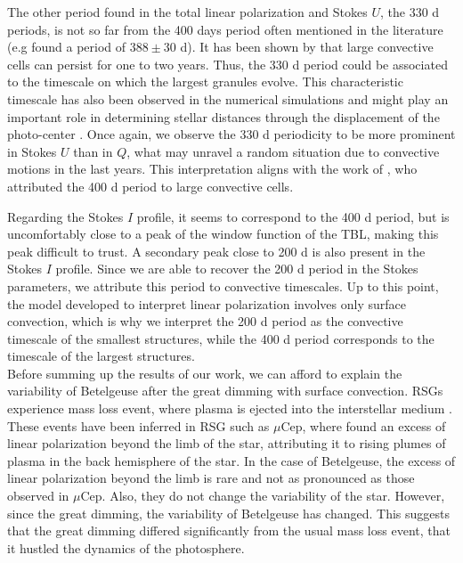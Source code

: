 \documentclass{aa}
\begin{document}
The other period found in the total linear polarization and Stokes $U$, the 330 d periods, is not so far from the 400 days period often mentioned in the literature (e.g \cite{kiss_variability_2006} found a period of $388 \pm 30$ d). It has been shown by \cite{lopez_ariste_convective_2018} that large convective cells can persist for one to two years. Thus, the 330 d period could be associated to the timescale on which the largest granules evolve. This characteristic timescale has also been observed in the numerical simulations and might play an important role in determining stellar distances through the displacement of the photo-center \citep{chiavassa_probing_2022}. Once again, we observe the 330 d periodicity to be more prominent in Stokes $U$ than in $Q$, what may unravel a random situation due to convective motions in the last years. This interpretation aligns with the work of \cite{gray_mass_2008}, who attributed the 400 d period to large convective cells.  \

Regarding the Stokes $I$ profile, it seems to correspond to the 400 d period, but is uncomfortably close to a peak of the window function of the TBL, making this peak difficult to trust. A secondary peak close to 200 d is also present in the Stokes $I$ profile. Since we are able to recover the 200 d period in the Stokes parameters, we attribute this period to convective timescales. Up to this point, the model developed to interpret linear polarization involves only surface convection, which is why we interpret the 200 d period as the convective timescale of the smallest structures, while the 400 d period corresponds to the timescale of the largest structures.\\



Before summing up the results of our work, we can afford to explain the variability of Betelgeuse after the great dimming with surface convection. RSGs experience mass loss event, where plasma is ejected into the interstellar medium \citep{josselin_atmospheric_2007}. These events have been inferred in RSG such as $\mu$Cep, where \cite{lopez_ariste_height_2023} found an excess of linear polarization beyond the limb of the star, attributing it to rising plumes of plasma in the back hemisphere of the star. In the case of Betelgeuse, the excess of linear polarization beyond the limb is rare and not as pronounced as those observed in $\mu$Cep. Also, they do not change the variability of the star. However, since the great dimming, the variability of Betelgeuse has changed. This suggests that the great dimming differed significantly from the usual mass loss event, that it hustled the dynamics of the photosphere. \
\end{document}
